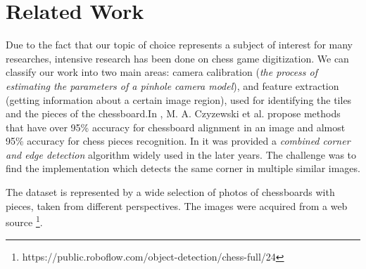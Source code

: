 \documentclass[conference]{IEEEtran}
\begin{document}
\section{Related Work}
Due to the fact that our topic of choice represents a subject of interest for many researches, intensive research has been done on chess game digitization. We can classify our work into two main areas: camera calibration (\emph{the process of estimating the parameters of a pinhole camera model}\cite{czyzewski20}), and feature extraction (getting information about a certain image region), used for identifying the tiles and the pieces of the chessboard.In \cite{czyzewski20}, M. A. Czyzewski et al. propose methods that have over 95\% accuracy for chessboard alignment in an image and almost 95\% accuracy for chess pieces recognition. In \cite{harris88} it was provided a \emph{combined corner and edge detection}  algorithm widely used in the later years. The challenge was to find the implementation which detects the same corner in multiple similar images. 

The dataset is represented by a wide selection of photos of chessboards with pieces, taken from different perspectives. The images were acquired from a web source \footnote{https://public.roboflow.com/object-detection/chess-full/24}.
\end{document}
